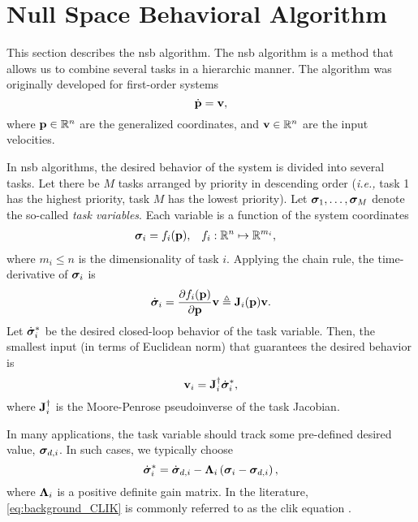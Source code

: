 \section{Null Space Behavioral Algorithm}
\label{sec:background_NSB}

This section describes the \acrfull{nsb} algorithm.
The \gls{nsb} algorithm is a method that allows us to combine several tasks in a hierarchic manner.
The algorithm was originally developed for first-order systems
\begin{equation}
    \dot{\mathbf{p}} = \mathbf{v},
\end{equation}
where $\mathbf{p} \in \mathbb{R}^n$ are the generalized coordinates, and $\mathbf{v} \in \mathbb{R}^n$ are the input velocities.

In \gls{nsb} algorithms, the desired behavior of the system is divided into several tasks.
Let there be $M$ tasks arranged by priority in descending order (\emph{i.e.,} task 1 has the highest priority, task $M$ has the lowest priority).
Let $\bm{\sigma}_1, \ldots, \bm{\sigma}_M$ denote the so-called \emph{task variables}.
Each variable is a function of the system coordinates
\begin{align}
    \bm{\sigma}_i &= f_i(\mathbf{p}), &
    f_i &: \mathbb{R}^n \mapsto \mathbb{R}^{m_i},
\end{align}
where $m_i \leq n$ is the dimensionality of task $i$.
Applying the chain rule, the time-derivative of $\bm{\sigma}_i$ is
\begin{equation}
    \dot{\bm{\sigma}}_i = \frac{\partial f_i(\mathbf{p})}{\partial \mathbf{p}} \mathbf{v} \triangleq \mathbf{J}_i(\mathbf{p}) \mathbf{v}.
\end{equation}
Let $\dot{\bm{\sigma}}_i^{*}$ be the desired closed-loop behavior of the task variable.
Then, the smallest input (in terms of Euclidean norm) that guarantees the desired behavior is
\begin{equation}
    \mathbf{v}_i = \mathbf{J}_i^{\dagger} \dot{\bm{\sigma}}_i^{*},
    \label{eq:background_NSB_velocity_i}
\end{equation}
where $\mathbf{J}_i^{\dagger}$ is the Moore-Penrose pseudoinverse of the task Jacobian.

\begin{rmk*}
    In many applications, the task variable should track some pre-defined desired value, $\bm{\sigma}_{d, i}$.
    In such cases, we typically choose
    \begin{equation}
        \dot{\bm{\sigma}}_i^{*} = \dot{\bm{\sigma}}_{d, i} - \bm{\Lambda}_i \left(\bm{\sigma}_i - \bm{\sigma}_{d,i}\right),  
        \label{eq:background_CLIK}  
    \end{equation}
    where $\bm{\Lambda}_i$ is a positive definite gain matrix.
    In the literature, \eqref{eq:background_CLIK} is commonly referred to as the \gls{clik} equation \cite{antonelli_2006_kinematic}.
\end{rmk*}

